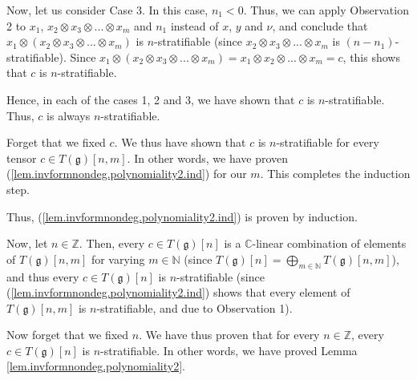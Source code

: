 \documentclass[etingof-lie.tex]{subfiles}
\begin{document}
Now, let us consider Case 3. In this case, $n_{1}<0$. Thus, we can apply
Observation 2 to $x_{1}$, $x_{2}\otimes x_{3}\otimes...\otimes x_{m}$ and
$n_{1}$ instead of $x$, $y$ and $\nu$, and conclude that $x_{1}\otimes\left(
x_{2}\otimes x_{3}\otimes...\otimes x_{m}\right)  $ is $n$-stratifiable (since
$x_{2}\otimes x_{3}\otimes...\otimes x_{m}$ is $\left(  n-n_{1}\right)
$-stratifiable). Since $x_{1}\otimes\left(  x_{2}\otimes x_{3}\otimes
...\otimes x_{m}\right)  =x_{1}\otimes x_{2}\otimes...\otimes x_{m}=c$, this
shows that $c$ is $n$-stratifiable.

Hence, in each of the cases 1, 2 and 3, we have shown that $c$ is
$n$-stratifiable. Thus, $c$ is always $n$-stratifiable.

Forget that we fixed $c$. We thus have shown that $c$ is $n$-stratifiable for
every tensor $c\in T\left(  \mathfrak{g}\right)  \left[  n,m\right]  $. In
other words, we have proven (\ref{lem.invformnondeg.polynomiality2.ind}) for
our $m$. This completes the induction step.

Thus, (\ref{lem.invformnondeg.polynomiality2.ind}) is proven by induction.

Now, let $n\in\mathbb{Z}$. Then, every $c\in T\left(  \mathfrak{g}\right)
\left[  n\right]  $ is a $\mathbb{C}$-linear combination of elements of
$T\left(  \mathfrak{g}\right)  \left[  n,m\right]  $ for varying
$m\in\mathbb{N}$ (since $T\left(  \mathfrak{g}\right)  \left[  n\right]
=\bigoplus\limits_{m\in\mathbb{N}}T\left(  \mathfrak{g}\right)  \left[
n,m\right]  $), and thus every $c\in T\left(  \mathfrak{g}\right)  \left[
n\right]  $ is $n$-stratifiable (since
(\ref{lem.invformnondeg.polynomiality2.ind}) shows that every element of
$T\left(  \mathfrak{g}\right)  \left[  n,m\right]  $ is $n$-stratifiable, and
due to Observation 1).

Now forget that we fixed $n$. We have thus proven that for every
$n\in\mathbb{Z}$, every $c\in T\left(  \mathfrak{g}\right)  \left[  n\right]
$ is $n$-stratifiable. In other words, we have proved Lemma
\ref{lem.invformnondeg.polynomiality2}.
\end{document}
